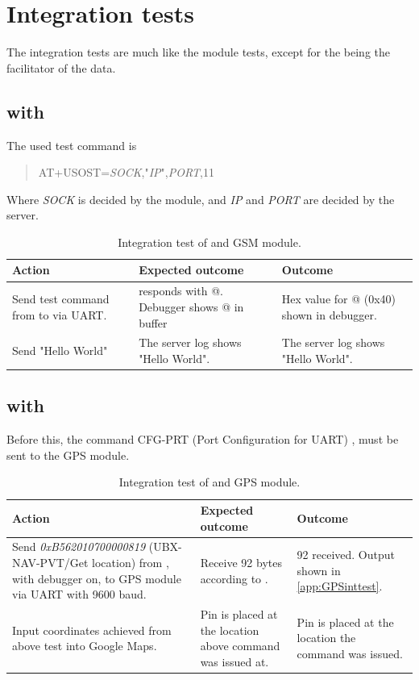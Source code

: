 \section{Integration tests}
The integration tests are much like the module tests, except for the \MKR being the facilitator of the data.

\subsection{\MKR with \SARA}
The used test command is
\begin{quote}
	AT+USOST=\textit{SOCK},"\textit{IP}",\textit{PORT},11
\end{quote}
Where \textit{SOCK} is decided by the \SARA module, and \textit{IP} and \textit{PORT} are decided by the server.

\begin{table}[H]
	\centering
	\begin{tabularx}{\textwidth}{p{4.3cm} X X}
		\toprule
		\textbf{Action} & \textbf{Expected outcome} & \textbf{Outcome} \\
		\midrule
		Send test command from \MKR to \SARA via UART. &
		\SARA responds with @. Debugger shows @ in buffer & Hex value for @ (0x40) shown in debugger.\\
		Send "Hello World" & The server log shows "Hello World". & The server log shows "Hello World".\\
		\bottomrule
	\end{tabularx}
	\caption{Integration test of \MKR and \SARA GSM module.}
	\label{AT:intGSM}
\end{table}

\subsection{\MKR with \GPS}
Before this, the command CFG-PRT (Port Configuration for UART) \cite[p.~119-120]{NEO7_proto}, must be sent to the GPS module.

\begin{table}[H]
	\centering
	\begin{tabularx}{\textwidth}{p{4.3cm} X X}
		\toprule
		\textbf{Action} & \textbf{Expected outcome} & \textbf{Outcome} \\
		\midrule
		Send \textit{0xB562010700000819} (UBX-NAV-PVT/Get location) from \MKR, with debugger on, to GPS module via UART with \num{9600} baud. & Receive \num{92} bytes according to \cite[p.~160-161]{NEO7_proto}. & \SI{92}{\byte} received. Output shown in \cref{app:GPSinttest}. \\
		Input coordinates achieved from above test into Google Maps. & Pin is placed at the location above command was issued at. & Pin is placed at the location the command was issued. \\
		\bottomrule
	\end{tabularx}
	\caption{Integration test of \MKR and \GPS GPS module.}
	\label{AT:intGPS}
\end{table}

